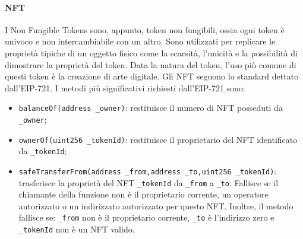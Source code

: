 \documentclass[a4paper]{article}
\begin{document}
    \paragraph{NFT}
    I Non Fungible Tokens sono, appunto, token non fungibili, ossia ogni token è univoco e non intercambiabile con un altro. Sono utilizzati per replicare le proprietà tipiche
    di un oggetto fisico come la scarsità, l'unicità e la possibilità di dimostrare la proprietà del token\cite{nft}.
    Data la natura del token, l'uso più comune di questi token è la creazione di arte digitale\cite{nftuse}.
    \newline
    Gli NFT seguono lo standard dettato dall'EIP-721. I metodi più significativi richiesti dall'EIP-721 sono:
    \begin{itemize}
      \item \verb|balanceOf(address _owner)|: restituisce il numero di NFT posseduti da \verb|_owner|;
      \item \verb|ownerOf(uint256 _tokenId)|: restituisce il proprietario del NFT identificato da \verb|_tokenId|;
      \item \verb|safeTransferFrom(address _from,address _to,uint256 _tokenId)|: trasferisce la proprietà del NFT \verb|_tokenId| da \verb|_from| a \verb|_to|.
            Fallisce se il chiamante della funzione non è il proprietario corrente, un operatore autorizzato o un indirizzato autorizzato per questo NFT.
            Inoltre, il metodo fallisce se: \verb|_from| non è il proprietario corrente, \verb|_to| è l'indirizzo zero e \verb|_tokenId| non è un NFT valido\cite{eip1155}.
    \end{itemize}
\end{document}
